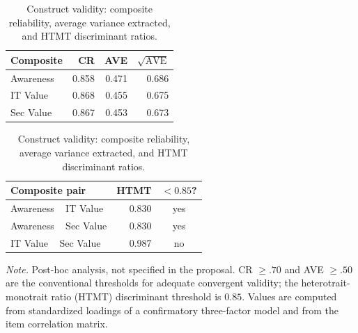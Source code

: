 \begin{table}[htbp]\centering
\caption{Construct validity: composite reliability, average variance extracted, and HTMT discriminant ratios.}\label{tab:construct}
\begin{tabular}{@{}lrrr@{}}\toprule
\textbf{Composite} & \textbf{CR} & \textbf{AVE} & \textbf{$\sqrt{\text{AVE}}$} \\ \midrule
Awareness & 0.858 & 0.471 & 0.686 \\
IT Value & 0.868 & 0.455 & 0.675 \\
Sec Value & 0.867 & 0.453 & 0.673 \\
\bottomrule
\end{tabular}
\smallskip

\begin{tabular}{@{}lrc@{}}\toprule
\textbf{Composite pair} & \textbf{HTMT} & \textbf{$<0.85$?} \\ \midrule
Awareness ~ IT Value & 0.830 & yes \\
Awareness ~ Sec Value & 0.830 & yes \\
IT Value ~ Sec Value & 0.987 & no \\
\bottomrule
\end{tabular}

\smallskip
\parbox{4.8in}{\footnotesize \textit{Note.} Post-hoc analysis, not specified in the proposal. CR $\geq .70$ and
AVE $\geq .50$ are the conventional thresholds for adequate convergent validity; the heterotrait-monotrait
ratio (HTMT) discriminant threshold is $0.85$. Values are computed from standardized loadings of a
confirmatory three-factor model and from the item correlation matrix.}
\end{table}